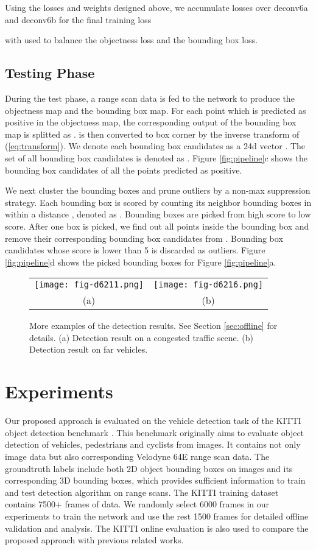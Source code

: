 \documentclass[conference]{IEEEtran}
\begin{document}
Using the losses and weights designed above, we accumulate losses over deconv6a and deconv6b for the final training loss

with  used to balance the objectness loss and the bounding box loss.


\subsection{Testing Phase}
During the test phase, a range scan data is fed to the network to produce the objectness map and the bounding box map. For each point which is predicted as positive in the objectness map, the corresponding output  of the bounding box map is splitted as .  is then converted to box corner  by the inverse transform of (\ref{eq:transform}). We denote each bounding box candidates as a 24d vector . The set of all bounding box candidates is denoted as . Figure \ref{fig:pipeline}c shows the bounding box candidates of all the points predicted as positive. 

We next cluster the bounding boxes and prune outliers by a non-max suppression strategy. Each bounding box  is scored by counting its neighbor bounding boxes in  within a distance , denoted as . Bounding boxes are picked from high score to low score. After one box is picked, we find out all points inside the bounding box and remove their corresponding bounding box candidates from . Bounding box candidates whose score is lower than 5 is discarded as outliers. Figure \ref{fig:pipeline}d shows the picked bounding boxes for Figure \ref{fig:pipeline}a.

\begin{figure*}
\centering
\begin{tabular}{cc}
\texttt{[image: fig-d6211.png]} & \texttt{[image: fig-d6216.png]} \\
(a) & (b)
\end{tabular}
\caption{More examples of the detection results. See Section \ref{sec:offline} for details. (a) Detection result on a congested traffic scene. (b) Detection result on far vehicles. }
\label{fig:samples}
\end{figure*}

\section{Experiments}
Our proposed approach is evaluated on the vehicle detection task of the KITTI object detection benchmark \cite{Geiger2012}. This benchmark originally aims to evaluate object detection of vehicles, pedestrians and cyclists from images. It contains not only image data but also corresponding Velodyne 64E range scan data. The groundtruth labels include both 2D object bounding boxes on images and its corresponding 3D bounding boxes, which provides sufficient information to train and test detection algorithm on range scans. The KITTI training dataset contains 7500+ frames of data. We randomly select 6000 frames in our experiments to train the network and use the rest 1500 frames for detailed offline validation and analysis. The KITTI online evaluation is also used to compare the proposed approach with previous related works.
\end{document}
